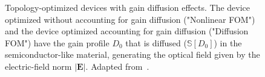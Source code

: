 \begin{figure}[tb]
    \centering
    \caption{Topology-optimized devices with gain diffusion effects. The device optimized without accounting for gain diffusion ("Nonlinear FOM") and the device optimized accounting for gain diffusion ("Diffusion FOM") have the gain profile $D_0$ that is diffused ($\mathbb{S}[D_0]$)
    in the semiconductor-like material, generating the optical field given by the electric-field norm $\vert \mathbf{E} \vert$. Adapted from~\cite{ownpub4}.}
    \label{fig:laser2d}
\end{figure}

